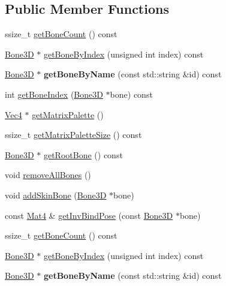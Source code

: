 \subsection*{Public Member Functions}
\begin{DoxyCompactItemize}
\item 
ssize\+\_\+t \hyperlink{classMeshSkin_a6316d1f7adb6333b6998eb20d4420d05}{get\+Bone\+Count} () const
\item 
\hyperlink{classBone3D}{Bone3D} $\ast$ \hyperlink{classMeshSkin_a5fda81de94dbfed1a3af0fff7806321b}{get\+Bone\+By\+Index} (unsigned int index) const
\item 
\mbox{\label{classMeshSkin_a1faaba8b7c6925e703549389f14e7bc5}} 
\hyperlink{classBone3D}{Bone3D} $\ast$ {\bfseries get\+Bone\+By\+Name} (const std\+::string \&id) const
\item 
int \hyperlink{classMeshSkin_a79b2269d85ee8b9cda3e35126cda511f}{get\+Bone\+Index} (\hyperlink{classBone3D}{Bone3D} $\ast$bone) const
\item 
\hyperlink{classVec4}{Vec4} $\ast$ \hyperlink{classMeshSkin_a7b69c95bc99166c91cd20b8aa24f1ac2}{get\+Matrix\+Palette} ()
\item 
ssize\+\_\+t \hyperlink{classMeshSkin_a34c91f249fdec320a2a3243ce7a184c9}{get\+Matrix\+Palette\+Size} () const
\item 
\hyperlink{classBone3D}{Bone3D} $\ast$ \hyperlink{classMeshSkin_a724b98e3bd3ea369e2fa4cc56e9ef1b0}{get\+Root\+Bone} () const
\item 
void \hyperlink{classMeshSkin_add548f76d7d93110413d5da980c9efb0}{remove\+All\+Bones} ()
\item 
void \hyperlink{classMeshSkin_a64945183efaca64d7b7fdd9c74262ed1}{add\+Skin\+Bone} (\hyperlink{classBone3D}{Bone3D} $\ast$bone)
\item 
const \hyperlink{classMat4}{Mat4} \& \hyperlink{classMeshSkin_aaafc6c9736be6dcab5f26e6a6bde79e7}{get\+Inv\+Bind\+Pose} (const \hyperlink{classBone3D}{Bone3D} $\ast$bone)
\item 
ssize\+\_\+t \hyperlink{classMeshSkin_a6316d1f7adb6333b6998eb20d4420d05}{get\+Bone\+Count} () const
\item 
\hyperlink{classBone3D}{Bone3D} $\ast$ \hyperlink{classMeshSkin_a6bf277ae3b68235b5a9821dd847aabf7}{get\+Bone\+By\+Index} (unsigned int index) const
\item 
\mbox{\label{classMeshSkin_a99e6a2aa659bb4a62a1a4d7349f3d3ba}} 
\hyperlink{classBone3D}{Bone3D} $\ast$ {\bfseries get\+Bone\+By\+Name} (const std\+::string \&id) const

\end{DoxyCompactItemize}
